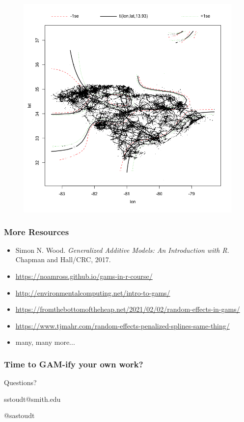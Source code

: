 \documentclass{beamer}
\begin{document}
\begin{frame}
\begin{multicols}{2}
\columnbreak

\begin{figure}
\includegraphics[scale=.2]{figures/lonlat}
\end{figure}

\end{multicols}


\end{frame}

\begin{frame}
\frametitle{More Resources}
\begin{itemize}
\item Simon N. Wood. \textit{Generalized Additive Models: An Introduction with R.} Chapman and Hall/CRC, 2017.
\item \url{https://noamross.github.io/gams-in-r-course/}
\item \url{http://environmentalcomputing.net/intro-to-gams/}
\item \url{https://fromthebottomoftheheap.net/2021/02/02/random-effects-in-gams/}
\item \url{https://www.tjmahr.com/random-effects-penalized-splines-same-thing/}
\item many, many more...
\end{itemize}
\end{frame}

\begin{frame}
\LARGE

\begin{center}
\frametitle{Time to GAM-ify your own work?}
Questions?

\vspace{.2in}

sstoudt@smith.edu

\vspace{.2in}

@sastoudt

\end{center}
\end{frame}
\end{document}
